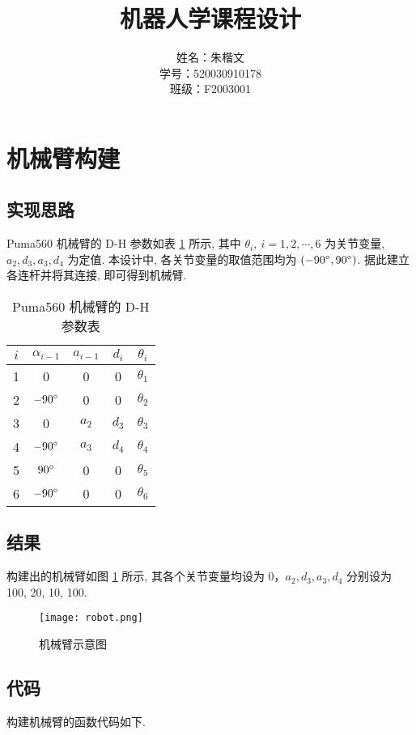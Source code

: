 \documentclass{article}
\title{机器人学课程设计}
\author{姓名：朱楷文\\ 学号：520030910178\\ 班级：F2003001 }
\date{}
\begin{document}
\maketitle

\section{机械臂构建}
\subsection{实现思路}
Puma560 机械臂的 D-H 参数如表 \ref{DH} 所示, 其中 $\theta_i,\  i=1,2,\cdots,6$ 为关节变量, $a_2, d_3, a_3, d_4$ 为定值. 本设计中, 各关节变量的取值范围均为 $(-90\degree, 90\degree)$. 据此建立各连杆并将其连接, 即可得到机械臂.
\begin{table}[H]
    \centering
    \caption{Puma560 机械臂的 D-H 参数表}
    \label{DH}
    \begin{tabular}{ccccc}
    \toprule
    $i$ & $\alpha_{i-1}$ & $a_{i-1}$ & $d_i$ & $\theta_i$  \\
    \midrule
    1   &  0 & 0 & 0 & $\theta_1$ \\
    2   &  $-90\degree$ & 0 & 0 & $\theta_2$ \\
    3   &  0 & $a_2$ & $d_3$ & $\theta_3$ \\
    4   &  $-90\degree$ & $a_3$ & $d_4$ & $\theta_4$ \\
    5   &  $90\degree$ & 0 & 0 & $\theta_5$ \\
    6   &  $-90\degree$ & 0 & 0 & $\theta_6$ \\
    \bottomrule
    \end{tabular}
\end{table}

\subsection{结果}
构建出的机械臂如图 \ref{robot} 所示, 其各个关节变量均设为 0，$a_2, d_3, a_3, d_4$ 分别设为 100, 20, 10, 100.
\begin{figure}[H]
    \centering
    \texttt{[image: robot.png]}
    \caption{机械臂示意图}
    \label{robot}
\end{figure}

\subsection{代码}
构建机械臂的函数代码如下.
\medskip

\end{document}
